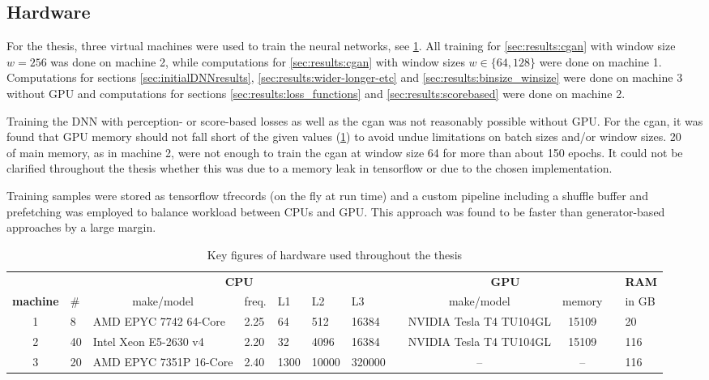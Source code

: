 \clearpage
\begin{landscape}
\subsection{Hardware}\label{sec:appendix:hardware}
For the thesis, three virtual machines were used to train the neural networks, see \cref{tab:appendix:hardware}.
All training for \cref{sec:results:cgan} with window size $w=256$ was done on machine 2, 
while computations for  \cref{sec:results:cgan} with window sizes $w \in \{64,128\}$ were done on machine 1.
Computations for sections \ref{sec:initialDNNresults}, \ref{sec:results:wider-longer-etc} and \ref{sec:results:binsize_winsize}
were done on machine 3 without GPU and computations for sections \ref{sec:results:loss_functions} and \ref{sec:results:scorebased} were done on machine 2.

Training the DNN with perception- or score-based losses as well as the \acrshort{cgan} was not reasonably possible without GPU.
For the \acrshort{cgan}, it was found that GPU memory should not fall short of the given values (\cref{tab:appendix:hardware})
to avoid undue limitations on batch sizes and/or window sizes.
\SI{20}{\giga\byte} of main memory, as in machine 2, were not enough to train the \acrshort{cgan} at window size 64 for more than about 150 epochs.
It could not be clarified throughout the thesis whether this was due to a memory leak in tensorflow or due to the chosen implementation.

Training samples were stored as tensorflow tfrecords (on the fly at run time) and a custom pipeline including a shuffle buffer and prefetching 
was employed to balance workload between CPUs and GPU.
This approach was found to be faster than generator-based approaches by a large margin.
 \begin{table}[hbp]
\small
\centering
\begin{tabular}{c|lllllllccll}
\hline
\textbf{}        &    & \multicolumn{5}{c}{\textbf{CPU}}                               &  & \multicolumn{2}{c}{\textbf{GPU}} &  & \multicolumn{1}{c}{\textbf{RAM}} \\
\textbf{machine} & \# & \multicolumn{1}{c}{make/model} & freq. & L1   & L2    & L3     &  & make/model              & memory &  & in GB                            \\ \hline
1                & 8  & AMD EPYC 7742 64-Core          & 2.25  & 64   & 512   & 16384  &  & NVIDIA Tesla T4 TU104GL & 15109  &  & 20                               \\
2                & 40 & Intel Xeon E5-2630 v4          & 2.20  & 32   & 4096  & 16384  &  & NVIDIA Tesla T4 TU104GL & 15109  &  & 116                              \\
3                & 20 & AMD EPYC 7351P 16-Core         & 2.40  & 1300 & 10000 & 320000 &  & --                      & --     &  & 116                              \\ \hline
\end{tabular}
\caption{Key figures of hardware used throughout the thesis}\label{tab:appendix:hardware}
\end{table}


\end{landscape}
